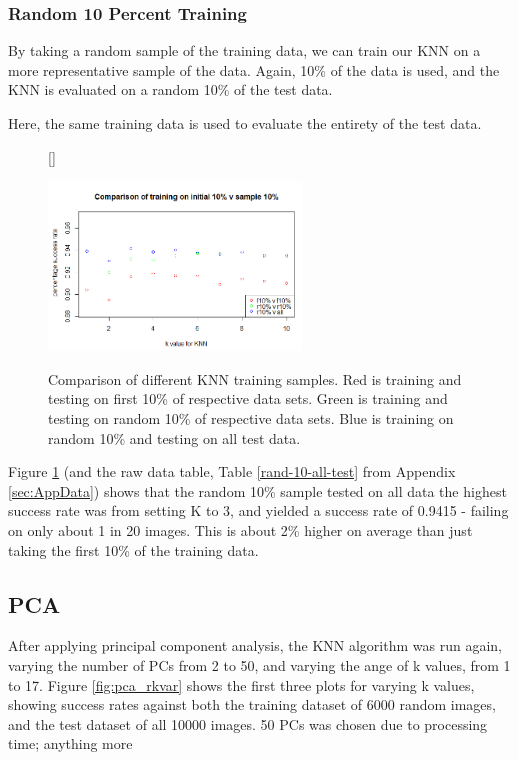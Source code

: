 \documentclass[11pt]{article} %
\begin{document}
\subsubsection{Random 10 Percent Training}

By taking a random sample of the training data, we can train our KNN on a more representative sample of the data. Again, 10\% of the data is used, and the KNN is evaluated on a random 10\% of the test data. 



Here, the same training data is used to evaluate the entirety of the test data. 

\begin{figure}[htb!]
[\FBwidth]
{\caption{Comparison of different KNN training samples. Red is training and testing on first 10\% of respective data sets. Green is training and testing on random 10\% of respective data sets. Blue is training on random 10\% and testing on all test data.}\label{fig:init_knn}}
{\includegraphics[width=0.6\textwidth]{10pc_training.png}}
\end{figure}



Figure \ref{fig:init_knn} (and the raw data table, Table \ref{rand-10-all-test} from Appendix \ref{sec:AppData}) shows that the random 10\% sample tested on all data the highest success rate was from setting K to $3$, and yielded a success rate of 0.9415 - failing on only about 1 in 20 images. This is about 2\% higher on average than just taking the first 10\% of the training data. 





\subsection{PCA}

After applying principal component analysis, the KNN algorithm was run again, varying the number of PCs from 2 to 50, and varying the ange of k values, from 1 to 17. Figure \ref{fig:pca_rkvar} shows the first three plots for varying k values, showing success rates against both the training dataset of 6000 random images, and the test dataset of all 10000 images.  50 PCs was chosen due to processing time; anything more 
\end{document}
